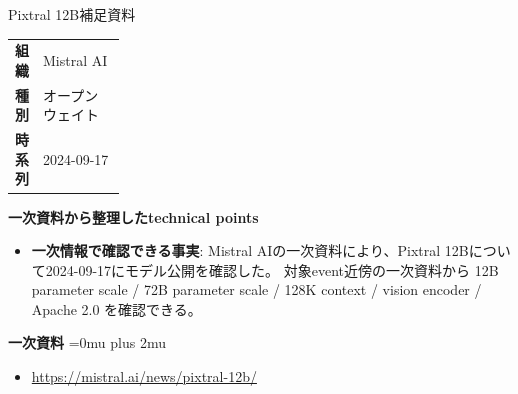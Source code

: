 \begin{technicalnote}{Pixtral 12B}{補足資料}
\begingroup
\begin{tabularx}{\linewidth}{@{}>{\bfseries}p{0.22\linewidth}X@{}}
組織 & Mistral AI \\
種別 & オープンウェイト \\
時系列 & 2024-09-17 \\
\end{tabularx}
\smallskip
{\bfseries 一次資料から整理したtechnical points}
\begin{itemize}[leftmargin=1.5em,itemsep=0.35em]
\item \textbf{一次情報で確認できる事実}: Mistral AIの一次資料により、Pixtral 12Bについて2024-09-17にモデル公開を確認した。 対象event近傍の一次資料から 12B parameter scale / 72B parameter scale / 128K context / vision encoder / Apache 2.0 を確認できる。
\end{itemize}
\begin{minipage}{\linewidth}
\begin{samepage}
{\bfseries 一次資料}
\begingroup\sloppy
\Urlmuskip=0mu plus 2mu\relax
\begin{itemize}[leftmargin=1.5em,itemsep=0.25em]
\item {\scriptsize\url{https://mistral.ai/news/pixtral-12b/}}
\end{itemize}
\endgroup
\end{samepage}
\end{minipage}
\endgroup
\end{technicalnote}
\medskip

